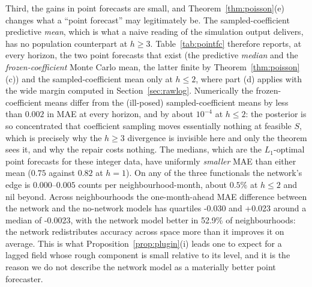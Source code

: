 \documentclass[12pt]{article}
\theoremstyle{plain}
\theoremstyle{definition}
\theoremstyle{remark}
\newcommand{\RegQtf}{-0.030}
\newcommand{\RegMed}{-0.0023}
\newcommand{\RegQsf}{+0.023}
\newcommand{\RegPropBetter}{52.9}
\begin{document}
Third, the gains in point forecasts are small, and Theorem~\ref{thm:poisson}(e) changes what a ``point forecast'' may legitimately be. The sampled-coefficient predictive \emph{mean}, which is what a naive reading of the simulation output delivers, has no population counterpart at $h\ge3$. Table~\ref{tab:pointfc} therefore reports, at every horizon, the two point forecasts that exist (the predictive \emph{median} and the \emph{frozen-coefficient} Monte Carlo mean, the latter finite by Theorem~\ref{thm:poisson}(c)) and the sampled-coefficient mean only at $h\le2$, where part (d) applies with the wide margin computed in Section~\ref{sec:rawlog}. Numerically the frozen-coefficient means differ from the (ill-posed) sampled-coefficient means by less than $0.002$ in MAE at every horizon, and by about $10^{-4}$ at $h\le2$: the posterior is so concentrated that coefficient sampling moves essentially nothing at feasible $S$, which is precisely why the $h\ge3$ divergence is invisible here and only the theorem sees it, and why the repair costs nothing. The medians, which are the $L_1$-optimal point forecasts for these integer data, have uniformly \emph{smaller} MAE than either mean ($0.75$ against $0.82$ at $h=1$). On any of the three functionals the network's edge is $0.000$--$0.005$ counts per neighbourhood-month, about $0.5\%$ at $h\le2$ and nil beyond. Across neighbourhoods the one-month-ahead MAE difference between the network and the no-network models has quartiles \RegQtf{} and \RegQsf{} around a median of \RegMed, with the network model better in \RegPropBetter\% of neighbourhoods: the network redistributes accuracy across space more than it improves it on average. This is what Proposition~\ref{prop:plugin}(i) leads one to expect for a lagged field whose rough component is small relative to its level, and it is the reason we do not describe the network model as a materially better point forecaster.

\begin{table}[t]
\centering\footnotesize
\caption{Point forecasts that exist, horizons $\{1,2,4,8\}$ under the per-origin-tuned protocol. Mean absolute error of the network (net) and no-network (non) dynamic models by horizon and by point-forecast functional ($S=400$): predictive median and frozen-coefficient Monte Carlo mean at all horizons. Sampled-coefficient mean only at $h\le2$, since Theorem~\ref{thm:poisson}(e) shows its population counterpart is infinite at $h\ge3$ under the Gaussian posterior. The predictive simulation clips the linear predictor at $\pm30$ and intensities at $10^{12}$.}\label{tab:pointfc}
\setlength{\tabcolsep}{4pt}
\end{table}
\end{document}

